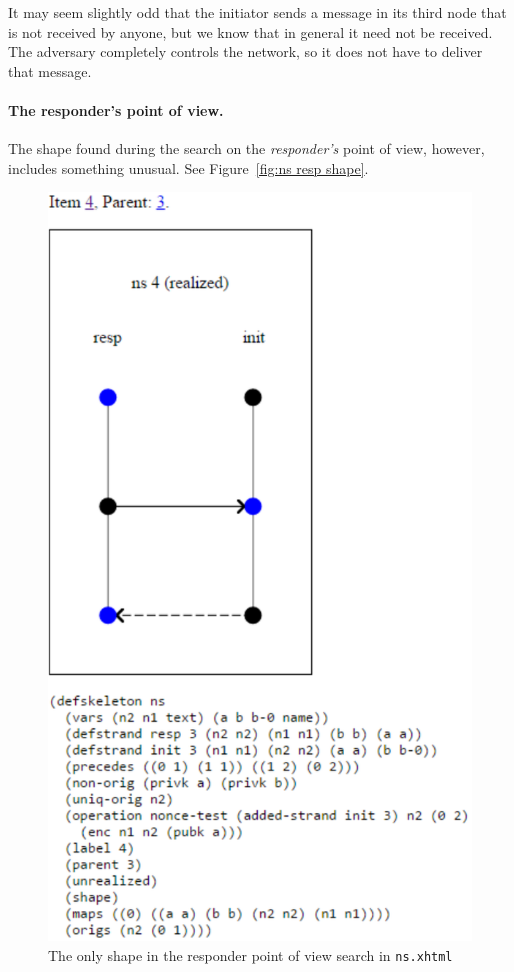 It may seem slightly odd that the initiator sends a message in its
third node that is not received by anyone, but we know that in general
it need not be received.  The adversary completely controls the network,
so it does not have to deliver that message.

\paragraph{The responder's point of view.}
The shape found during the search on the \emph{responder's} point of
view, however, includes something unusual.  See Figure~\ref{fig:ns
  resp shape}.

\begin{figure}
\centering
\includegraphics[scale=0.9]{ns_skel4}
\caption[NS shape for responder point of view]{The only shape in the
  responder point of view search in \texttt{ns.xhtml}}
\label{fig:ns resp shape}
\end{figure}

